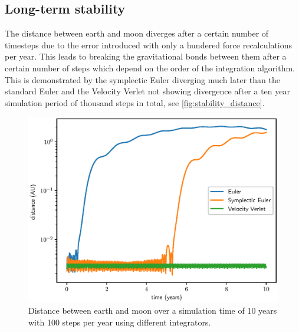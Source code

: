\documentclass[a4paper,10pt,bibtotoc]{scrartcl}
\begin{document}
\subsection{Long-term stability}
The distance between earth and moon diverges after a certain number of timesteps due to the error introduced with only a hundered force recalculations per year.
This leads to breaking the gravitational bonds between them after a certain number of steps which depend on the order of the integration algorithm.
This is demonstrated by the symplectic Euler diverging much later than the standard Euler and the Velocity Verlet not showing divergence
after a ten year simulation period of thousand steps in total, see \autoref{fig:stability_distance}.

\begin{figure}[h]
\centering
 \includegraphics[width=\textwidth]{stability_distance.eps}
 \caption{Distance between earth and moon over a simulation time of 10 years with 100 steps per year using different integrators.}
 \label{fig:stability_distance}
\end{figure}
\end{document}
